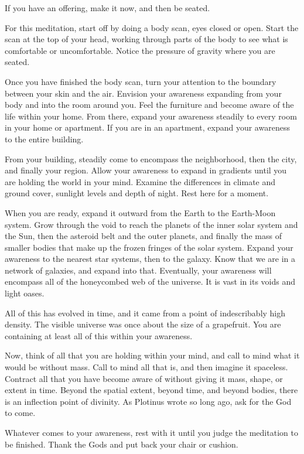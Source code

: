 \documentclass[
]{book}
\begin{document}
If you have an offering, make it now, and then be seated.

For this meditation, start off by doing a body scan, eyes closed or open. Start the scan at the top of your head, working through parts of the body to see what is comfortable or uncomfortable. Notice the pressure of gravity where you are seated.

Once you have finished the body scan, turn your attention to the boundary between your skin and the air. Envision your awareness expanding from your body and into the room around you. Feel the furniture and become aware of the life within your home. From there, expand your awareness steadily to every room in your home or apartment. If you are in an apartment, expand your awareness to the entire building.

From your building, steadily come to encompass the neighborhood, then the city, and finally your region. Allow your awareness to expand in gradients until you are holding the world in your mind. Examine the differences in climate and ground cover, sunlight levels and depth of night. Rest here for a moment.

When you are ready, expand it outward from the Earth to the Earth-Moon system. Grow through the void to reach the planets of the inner solar system and the Sun, then the asteroid belt and the outer planets, and finally the mass of smaller bodies that make up the frozen fringes of the solar system. Expand your awareness to the nearest star systems, then to the galaxy. Know that we are in a network of galaxies, and expand into that. Eventually, your awareness will encompass all of the honeycombed web of the universe. It is vast in its voids and light oases.

All of this has evolved in time, and it came from a point of indescribably high density. The visible universe was once about the size of a grapefruit. You are containing at least all of this within your awareness.

Now, think of all that you are holding within your mind, and call to mind what it would be without mass. Call to mind all that is, and then imagine it spaceless. Contract all that you have become aware of without giving it mass, shape, or extent in time. Beyond the spatial extent, beyond time, and beyond bodies, there is an inflection point of divinity. As Plotinus wrote so long ago, ask for the God to come.

Whatever comes to your awareness, rest with it until you judge the meditation to be finished. Thank the Gods and put back your chair or cushion.
\end{document}
